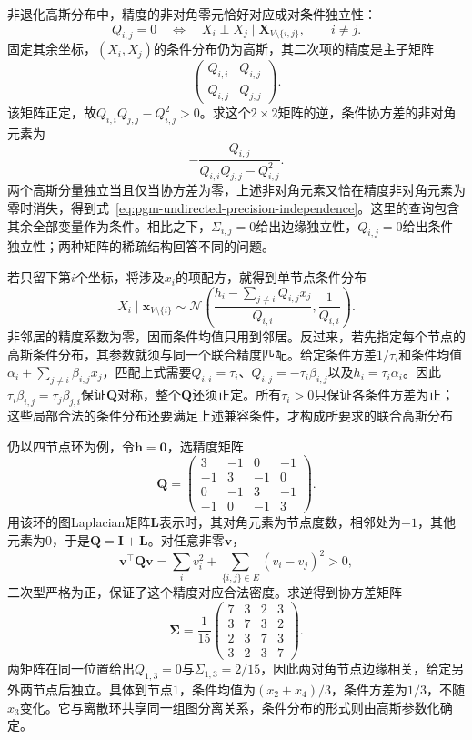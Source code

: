 非退化高斯分布中，精度的非对角零元恰好对应成对条件独立性：
\begin{equation}
  Q_{i,j}=0
  \quad\Longleftrightarrow\quad
  X_i\perp X_j\mid\bm{X}_{V\setminus\{i,j\}},
  \qquad i\neq j.
  \label{eq:pgm-undirected-precision-independence}
\end{equation}
固定其余坐标，$(X_i,X_j)$的条件分布仍为高斯，其二次项的精度是主子矩阵
\[
  \begin{pmatrix}Q_{i,i}&Q_{i,j}\\Q_{i,j}&Q_{j,j}\end{pmatrix}.
\]
该矩阵正定，故$Q_{i,i}Q_{j,j}-Q_{i,j}^2>0$。求这个$2\times2$矩阵的逆，条件协方差的非对角元素为
\[
  -\frac{Q_{i,j}}{Q_{i,i}Q_{j,j}-Q_{i,j}^2}.
\]
两个高斯分量独立当且仅当协方差为零，上述非对角元素又恰在精度非对角元素为零时消失，得到式~\eqref{eq:pgm-undirected-precision-independence}。这里的查询包含其余全部变量作为条件。相比之下，$\Sigma_{i,j}=0$给出边缘独立性，$Q_{i,j}=0$给出条件独立性；两种矩阵的稀疏结构回答不同的问题。

若只留下第$i$个坐标，将涉及$x_i$的项配方，就得到单节点条件分布
\begin{equation}
  X_i\mid\bm{x}_{V\setminus\{i\}}
  \sim\mathcal{N}\left(
    \frac{h_i-\sum_{j\neq i}Q_{i,j}x_j}{Q_{i,i}},
    \frac{1}{Q_{i,i}}\right).
  \label{eq:pgm-undirected-gaussian-conditional}
\end{equation}
非邻居的精度系数为零，因而条件均值只用到邻居。反过来，若先指定每个节点的高斯条件分布，其参数就须与同一个联合精度匹配。给定条件方差$1/\tau_i$和条件均值$\alpha_i+\sum_{j\neq i}\beta_{i,j}x_j$，匹配上式需要$Q_{i,i}=\tau_i$、$Q_{i,j}=-\tau_i\beta_{i,j}$以及$h_i=\tau_i\alpha_i$。因此$\tau_i\beta_{i,j}=\tau_j\beta_{j,i}$保证$\bm{Q}$对称，整个$\bm{Q}$还须正定。所有$\tau_i>0$只保证各条件方差为正；这些局部合法的条件分布还要满足上述兼容条件，才构成所要求的联合高斯分布

仍以四节点环为例，令$\bm{h}=\bm{0}$，选精度矩阵
\[
  \bm{Q}=
  \begin{pmatrix}
    3&-1&0&-1\\
    -1&3&-1&0\\
    0&-1&3&-1\\
    -1&0&-1&3
  \end{pmatrix}.
\]
用该环的图Laplacian矩阵$\bm{L}$表示时，其对角元素为节点度数，相邻处为$-1$，其他元素为$0$，于是$\bm{Q}=\bm{I}+\bm{L}$。对任意非零$\bm{v}$，
\[
  \bm{v}^{\top}\bm{Q}\bm{v}
  =\sum_i v_i^2+\sum_{\{i,j\}\in E}(v_i-v_j)^2>0,
\]
二次型严格为正，保证了这个精度对应合法密度。求逆得到协方差矩阵
\[
  \bm{\Sigma}=\frac{1}{15}
  \begin{pmatrix}
    7&3&2&3\\
    3&7&3&2\\
    2&3&7&3\\
    3&2&3&7
  \end{pmatrix}.
\]
两矩阵在同一位置给出$Q_{1,3}=0$与$\Sigma_{1,3}=2/15$，因此两对角节点边缘相关，给定另外两节点后独立。具体到节点$1$，条件均值为$(x_2+x_4)/3$，条件方差为$1/3$，不随$x_3$变化。它与离散环共享同一组图分离关系，条件分布的形式则由高斯参数化确定。


